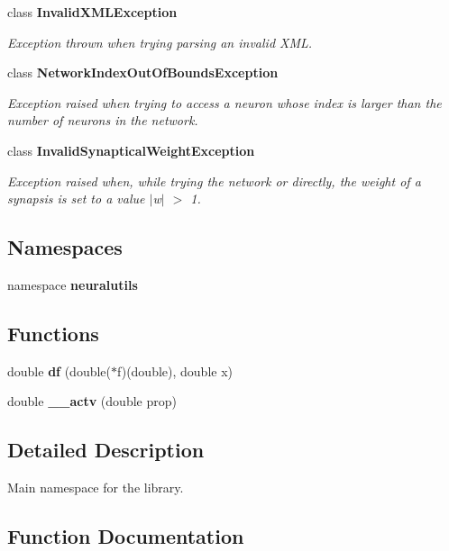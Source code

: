 \begin{CompactItemize}
class {\bf InvalidXMLException}
\begin{CompactList}\small\item\em Exception thrown when trying parsing an invalid XML. \item\end{CompactList}\item 
class {\bf NetworkIndexOutOfBoundsException}
\begin{CompactList}\small\item\em Exception raised when trying to access a neuron whose index is larger than the number of neurons in the network. \item\end{CompactList}\item 
class {\bf InvalidSynapticalWeightException}
\begin{CompactList}\small\item\em Exception raised when, while trying the network or directly, the weight of a synapsis is set to a value $|$w$|$ $>$ 1. \item\end{CompactList}\end{CompactItemize}
\subsection*{Namespaces}
\begin{CompactItemize}
\item 
namespace {\bf neuralutils}
\end{CompactItemize}
\subsection*{Functions}
\begin{CompactItemize}
\item 
double {\bf df} (double($\ast$f)(double), double x)
\item 
double {\bf \_\-\_\-actv} (double prop)
\end{CompactItemize}


\subsection{Detailed Description}
Main namespace for the library. 

\subsection{Function Documentation}
